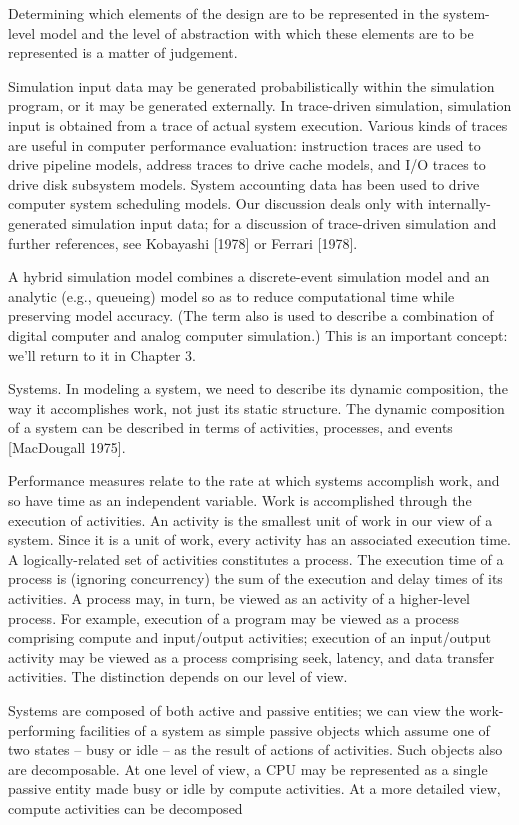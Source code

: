 \noindent Determining which elements of the design are to be represented in the
system-level model and the level of abstraction with which these elements are to
be represented is a matter of judgement.

Simulation input data may be generated probabilistically within the simulation
program, or it may be generated externally. In trace-driven simulation,
simulation input is obtained from a trace of actual system execution. Various
kinds of traces are useful in computer performance evaluation: instruction
traces are used to drive pipeline models, address traces to drive cache models,
and I/O traces to drive disk subsystem models. System accounting data has been
used to drive computer system scheduling models. Our discussion deals only with
internally-generated simulation input data; for a discussion of trace-driven
simulation and further references, see Kobayashi [1978] or Ferrari [1978].

A hybrid simulation model combines a discrete-event simulation model and an
analytic (e.g., queueing) model so as to reduce computational time while
preserving model accuracy. (The term also is used to describe a combination of
digital computer and analog computer simulation.) This is an important concept:
we'll return to it in Chapter 3.

Systems. In modeling a system, we need to describe its dynamic composition, the
way it accomplishes work, not just its static structure. The dynamic
composition of a system can be described in terms of activities, processes, and
events [MacDougall 1975].

Performance measures relate to the rate at which systems accomplish work, and
so have time as an independent variable. Work is accomplished through the
execution of activities. An activity is the smallest unit of work in our view
of a system. Since it is a unit of work, every activity has an associated
execution time. A logically-related set of activities constitutes a process.
The execution time of a process is (ignoring concurrency) the sum of the
execution and delay times of its activities. A process may, in turn, be viewed
as an activity of a higher-level process. For example, execution of a program
may be viewed as a process comprising compute and input/output activities;
execution of an input/output activity may be viewed as a process comprising
seek, latency, and data transfer activities. The distinction depends on our
level of view.

Systems are composed of both active and passive entities; we can view the
work-performing facilities of a system as simple passive objects which assume
one of two states -- busy or idle -- as the result of actions of activities.
Such objects also are decomposable. At one level of view, a CPU may be
represented as a single passive entity made busy or idle by compute activities.
At a more detailed view, compute activities can be decomposed

